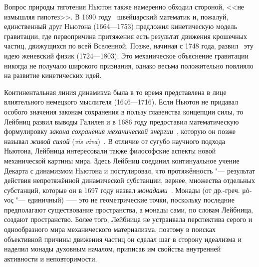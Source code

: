 \documentclass[a4paper, 12pt, oneside]{article} %
\begin{document}
Вопрос природы тяготения Ньютон также намеренно обходил стороной, <<не
измышляя гипотез>>. В 1690 году~\cite{duillier1690letter} швейцарский
математик и, пожалуй, единственный друг Ньютона  (1664---1753) предложил кинетическую модель гравитации, где
первопричина притяжения есть результат движения крошечных частиц,
движущихся по всей Вселенной. Позже, начиная с 1748 года,
развил~\cite{lesage1784lucrece} эту идею женевский физик
 (1724---1803). Это механическое объяснение
гравитации никогда не получало широкого признания, однако весьма
положительно повлияло на развитие кинетических идей.

Континентальная линия динамизма была в то время представлена в лице
влиятельного немецкого мыслителя 
(1646---1716). Если Ньютон не придавал особого значения законам
сохранения в пользу главенства концепции силы, то Лейбниц развил выводы
Галилея и в 1686 году предоставил математическую формулировку
\emph{закона сохранения механической
энергии}~\cite{leibniz1982descartes}, которую он позже называл
\emph{живой силой} (\emph{vis viva})~\cite{leibniz1982dynamics}. В
отличие от сугубо научного подхода Ньютона, Лейбница интересовали также
философские аспекты новой механической картины мира. Здесь Лейбниц
соединил континуальное учение Декарта с динамизмом Ньютона и
постулировал, что протяжённость "--- результат действия непротяжённой
динамической субстанции, вернее, множества отдельных субстанций, которые
он в 1697 году назвал \emph{монадами}~\cite{leibniz1982monadology}.
Монады (от др.-греч. \foreignlanguage{greek}{μόνος} "--- единичный) —--
это не геометрические точки, поскольку последние предполагают
существование пространства, а монады сами, по словам Лейбница, создают
пространство. Более того, Лейбница не устраивала перспектива серого и
однообразного мира механического материализма, поэтому в поисках
объективной причины движения частиц он сделал шаг в сторону идеализма и
наделил монады духовным началом, приписав им свойства внутренней
активности и неповторимости.
\end{document}
